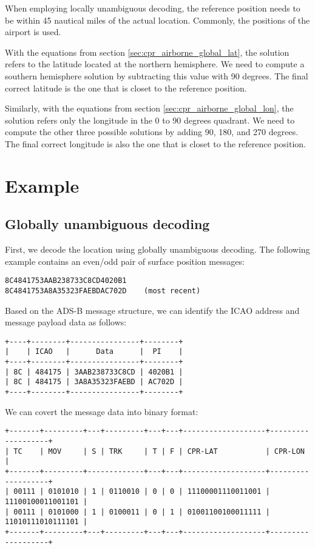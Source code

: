 When employing locally unambiguous decoding, the reference position needs to be within 45 nautical miles of the actual location. Commonly, the positions of the airport is used.

With the equations from section \ref{sec:cpr_airborne_global_lat}, the solution refers to the latitude located at the northern hemisphere. We need to compute a southern hemisphere solution by subtracting this value with 90 degrees. The final correct latitude is the one that is closet to the reference position.

Similarly, with the equations from section \ref{sec:cpr_airborne_global_lon}, the solution refers only the longitude in the 0 to 90 degrees quadrant. We need to compute the other three possible solutions by adding 90, 180, and 270 degrees. The final correct longitude is also the one that is closet to the reference position.




\section{Example}

\subsection{Globally unambiguous decoding}

First, we decode the location using globally unambiguous decoding. The following example contains an even/odd pair of surface position messages: 

\begin{verbatim}
8C4841753AAB238733C8CD4020B1
8C4841753A8A35323FAEBDAC702D    (most recent)
\end{verbatim}

Based on the ADS-B message structure, we can identify the ICAO address and message payload data as follows:

\begin{verbatim}
+----+--------+----------------+--------+
|    | ICAO   |      Data      |  PI    |
+----+--------+----------------+--------+
| 8C | 484175 | 3AAB238733C8CD | 4020B1 |
| 8C | 484175 | 3A8A35323FAEBD | AC702D |
+----+--------+----------------+--------+
\end{verbatim}

We can covert the message data into binary format:

\begin{verbatim}
+-------+---------+---+---------+---+---+-------------------+-------------------+
| TC    | MOV     | S | TRK     | T | F | CPR-LAT           | CPR-LON           |
+-------+---------+-------------+---+---+-------------------+-------------------+
| 00111 | 0101010 | 1 | 0110010 | 0 | 0 | 11100001110011001 | 11100100011001101 |
| 00111 | 0101000 | 1 | 0100011 | 0 | 1 | 01001100100011111 | 11010111010111101 |
+-------+---------+---+---------+---+---+-------------------+-------------------+
\end{verbatim}


